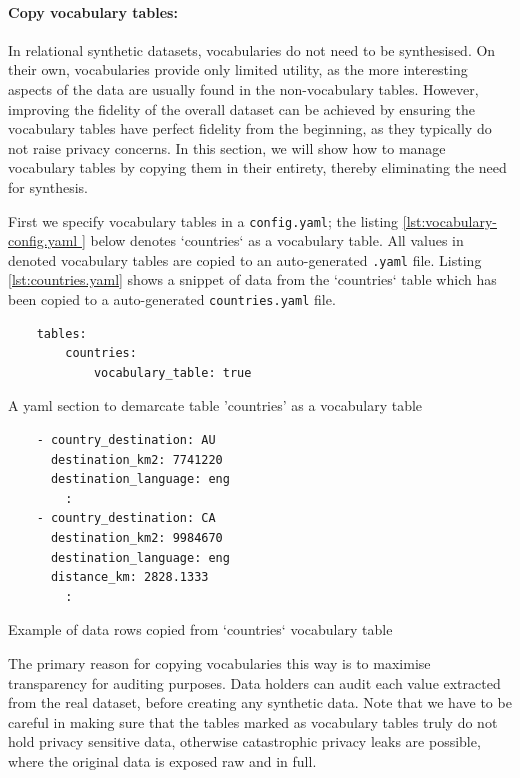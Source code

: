 \documentclass[11pt]{article}
\begin{document}
\paragraph{Copy vocabulary tables:}

In relational synthetic datasets, vocabularies do not need to be synthesised. On their own, vocabularies provide only limited utility, as the more interesting aspects of the data are usually found in the non-vocabulary tables. However, improving the fidelity of the overall dataset can be achieved by ensuring the vocabulary tables have perfect fidelity from the beginning, as they typically do not raise privacy concerns. In this section, we will show how to manage vocabulary tables by copying them in their entirety, thereby eliminating the need for synthesis.

First we specify vocabulary tables in a \texttt{config.yaml}; the listing \ref{lst:vocabulary-config.yaml } below denotes `countries` as a vocabulary table. All values in denoted vocabulary tables are copied to an auto-generated \texttt{.yaml} file. Listing \ref{lst:countries.yaml} shows a snippet of data from the `countries` table which has been copied to a auto-generated \texttt{countries.yaml} file.

\begin{listing}[H]
\begin{verbatim}
    tables:
        countries:
            vocabulary_table: true
\end{verbatim}
\caption{A yaml section to demarcate table 'countries' as a vocabulary table}
\label{lst:vocabulary-config.yaml }
\end{listing}

\begin{listing}[H]
\begin{verbatim}
    - country_destination: AU
      destination_km2: 7741220
      destination_language: eng
        :
    - country_destination: CA
      destination_km2: 9984670
      destination_language: eng
      distance_km: 2828.1333
        :
\end{verbatim}
\caption{Example of data rows copied from `countries` vocabulary table}
\label{lst:countries.yaml}
\end{listing}

The primary reason for copying vocabularies this way is to maximise transparency for auditing purposes. Data holders can audit each value extracted from the real dataset, before creating any synthetic data. Note that we have to be careful in making sure that the tables marked as vocabulary tables truly do not hold privacy sensitive data, otherwise catastrophic privacy leaks are possible, where the original data is exposed raw and in full. 
\end{document}
